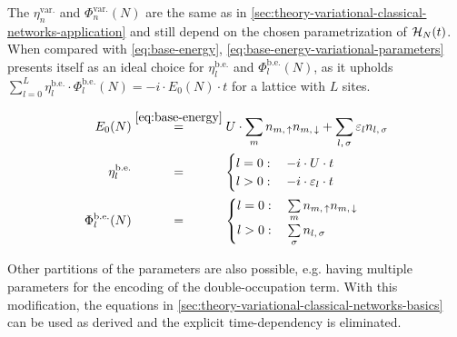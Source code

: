 The $\eta^\text{var.}_{n}$ and $\Phi^\text{var.}_{n}(N)$ are the same as in \autoref{sec:theory-variational-classical-networks-application} and still depend on the chosen parametrization of $\mathcal{H}_{N}(t)$.
When compared with \autoref{eq:base-energy}, \autoref{eq:base-energy-variational-parameters} presents itself as an ideal choice for $\eta^\text{b.e.}_{l}$ and $\Phi^\text{b.e.}_{l}(N)$, as it upholds $\sum\limits_{l=0}^{L} \eta^\text{b.e.}_{l} \cdot \Phi^\text{b.e.}_{l}(N) = -i \cdot E_0(N) \cdot t$ for a lattice with $L$ sites.

\begin{equation}
    \label{eq:base-energy-variational-parameters}
    \begin{split}
        E_0(N) &\stackrel{\ref{eq:base-energy}}{=} U \cdot \lsum[m] n_{m,\,\up}n_{m,\,\down} + \lsum[l,\,\sigma] \epsl n_{l,\,\sigma}\\
        \eta^\text{b.e.}_{l} &\stackrel{\phantom{\ref{eq:base-energy}}}{=} \begin{cases}
            l=0: \quad -i\cdot U \cdot t             \\
            l>0: \quad -i\cdot \epsl[l] \cdot t
        \end{cases}\\
        \Phi^\text{b.e.}_{l}(N) &\stackrel{\phantom{\ref{eq:base-energy}}}{=} \begin{cases}
            l=0: \quad \lsum[m] n_{m,\,\up}n_{m,\,\down}             \\
            l>0: \quad \lsum[\sigma] n_{l,\,\sigma}
        \end{cases}
    \end{split}
\end{equation}

Other partitions of the parameters are also possible, e.g. having multiple parameters for the encoding of the double-occupation term.
With this modification, the equations in \autoref{sec:theory-variational-classical-networks-basics} can be used as derived and the explicit time-dependency is eliminated.